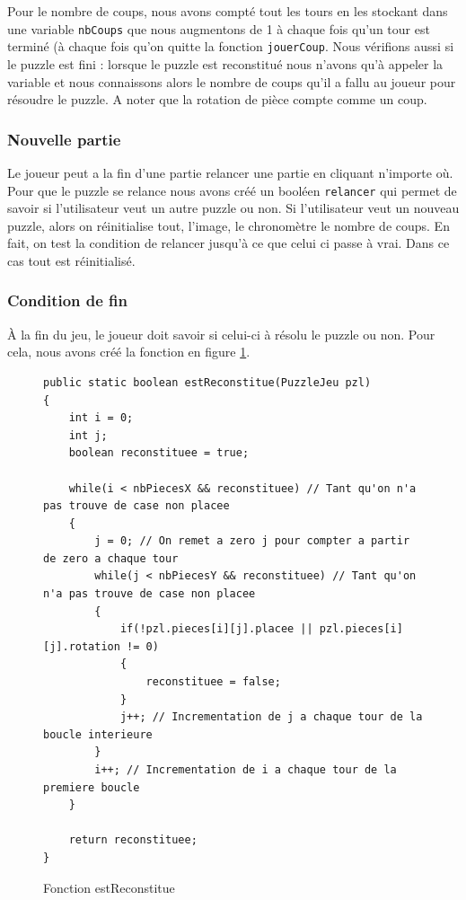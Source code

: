 \documentclass[]{article}
\newcommand{\variable}[1]{\noindent \texttt{#1}}
\begin{document}
Pour le nombre de coups, nous avons compté tout les tours en les stockant dans une variable \variable{nbCoups} que nous augmentons de 1 à chaque fois qu'un tour est terminé (à chaque fois qu'on quitte la fonction \variable{jouerCoup}. Nous vérifions aussi si le puzzle est fini : lorsque le puzzle est reconstitué nous n'avons qu'à appeler la variable et nous connaissons alors le nombre de coups qu'il a fallu au joueur pour résoudre le puzzle. A noter que la rotation de pièce compte comme un coup.

\subsubsection{Nouvelle partie}

Le joueur peut a la fin d'une partie relancer une partie en cliquant n'importe où. Pour que le puzzle se relance nous avons créé un booléen \variable{relancer} qui permet de savoir si l'utilisateur veut un autre puzzle ou non. Si l'utilisateur veut un nouveau puzzle, alors on réinitialise tout, l'image, le chronomètre le nombre de coups. En fait, on test la condition de relancer jusqu'à ce que celui ci passe à vrai. Dans ce cas tout est réinitialisé. 

\subsubsection{Condition de fin}

À la fin du jeu, le joueur doit savoir si celui-ci à résolu le puzzle ou non. Pour cela, nous avons créé la fonction en figure \no\ref{Fonction  estReconstitue}.

\begin{figure}[hpt]
	\center
	\caption{\label{Fonction  estReconstitue} Fonction  estReconstitue}
\begin{lstlisting}
public static boolean estReconstitue(PuzzleJeu pzl)
{
    int i = 0;
    int j;
    boolean reconstituee = true;

    while(i < nbPiecesX && reconstituee) // Tant qu'on n'a pas trouve de case non placee
    {
        j = 0; // On remet a zero j pour compter a partir de zero a chaque tour
        while(j < nbPiecesY && reconstituee) // Tant qu'on n'a pas trouve de case non placee
        {
            if(!pzl.pieces[i][j].placee || pzl.pieces[i][j].rotation != 0)
            {
                reconstituee = false;
            }
            j++; // Incrementation de j a chaque tour de la boucle interieure
        }
        i++; // Incrementation de i a chaque tour de la premiere boucle
    }

    return reconstituee;
}
\end{lstlisting}
\end{figure}
\end{document}
